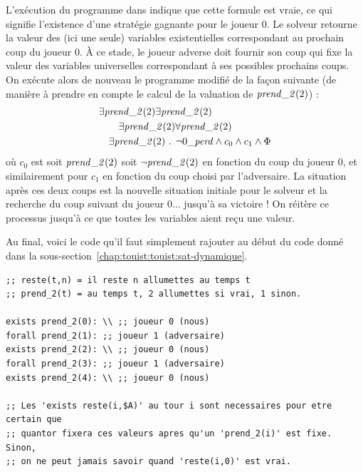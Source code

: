 L'exécution du programme dans \touist indique que cette formule est vraie, ce qui signifie l'existence d'une stratégie gagnante pour le joueur $0$. Le solveur retourne la valeur des (ici une seule) variables existentielles correspondant au prochain coup du joueur $0$. À ce stade, le joueur adverse doit fournir son coup qui fixe la valeur des variables universelles correspondant à ses possibles prochains coups. On exécute alors de nouveau le programme modifié de la façon suivante (de manière à prendre en compte le calcul de la valuation de $\takes{0}$) :
\begin{align*}
\begin{split}
&\exists \takes{0}
\exists \takes{1}\\
&\qquad\exists \takes{2}
\forall \takes{3} \\
&\quad\exists \takes{4}\text{ . }\neg \lost \land c_0 \land c_1 \land  \Phi
\end{split}
\end{align*}
où $c_0$ est soit $\takes{0}$ soit $\neg \takes{0}$ en fonction du coup du joueur $0$, et similairement pour $c_1$ en fonction du coup choisi par l'adversaire. La  situation après ces deux coups est la nouvelle situation initiale pour le solveur et la recherche du coup suivant du joueur $0$... jusqu'à sa victoire ! On réitère ce processus jusqu'à ce que toutes les variables aient reçu une valeur. 

Au final, voici le code \touist qu'il faut simplement rajouter au début du code donné dans la sous-section~\ref{chap:touist:touist:sat-dynamique}.%

\begin{lstlisting}[language=touist]
;; reste(t,n) = il reste n allumettes au temps t
;; prend_2(t) = au temps t, 2 allumettes si vrai, 1 sinon.

exists prend_2(0): \\ ;; joueur 0 (nous)
forall prend_2(1): ;; joueur 1 (adversaire)
exists prend_2(2): \\ ;; joueur 0 (nous)
forall prend_2(3): ;; joueur 1 (adversaire)
exists prend_2(4): \\ ;; joueur 0 (nous)

;; Les 'exists reste(i,$A)' au tour i sont necessaires pour etre certain que
;; quantor fixera ces valeurs apres qu'un 'prend_2(i)' est fixe. Sinon,
;; on ne peut jamais savoir quand 'reste(i,0)' est vrai.
\end{lstlisting}